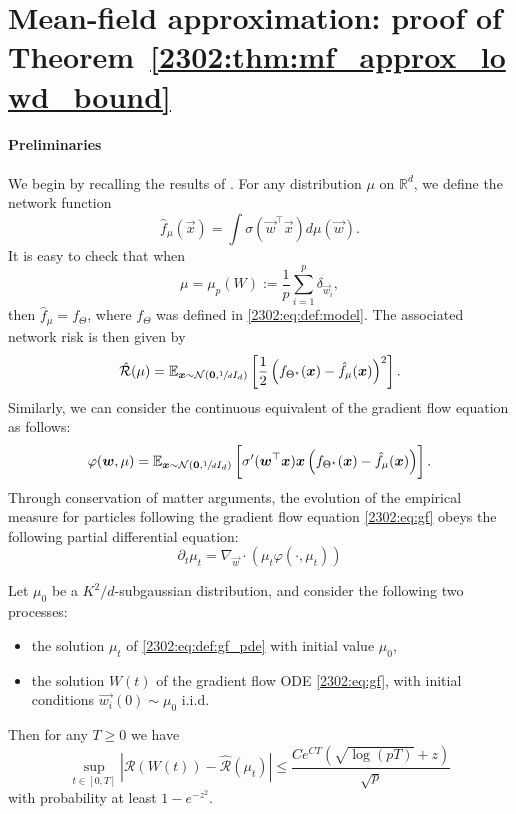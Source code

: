 \section{Mean-field approximation: proof of Theorem~\ref{2302:thm:mf_approx_lowd_bound}}

\label{2302:sec:app:mf}
\paragraph{Preliminaries} We begin by recalling the results of \cite{mei2019mean}. For any distribution $\mu$ on $\mathbb R^d$, we define the network function
\begin{equation}
    \hat f_{\mu}(\vec{x}) = \int \sigma(\vec{w}^\top \vec{x}) d\mu(\vec{w}).
\end{equation}
It is easy to check that when
\[ \mu = \mu_p(W) := \frac1p \sum_{i = 1}^p \delta_{\vec{w}_i}, \]
then $\hat f_\mu = f_\Theta$, where $f_\Theta$ was defined in \eqref{2302:eq:def:model}. The associated network risk is then given by
\begin{equation}
    \hat{\mathcal{R}}(\mu) = \mathbb E_{{\boldsymbol{x}} \sim \mathcal N({\boldsymbol{0}}, \sfrac{1}{d} I_d)} \left[\frac12\left( f_{\Theta^\star}({\boldsymbol{x}}) - \hat f_\mu({\boldsymbol{x}}) \right)^2 \right].
\end{equation}
Similarly, we can consider the continuous equivalent of the gradient flow equation as follows: 
\begin{equation}
    \varphi({\boldsymbol{w}}, \mu) = \mathbb E_{{\boldsymbol{x}} \sim \mathcal N({\boldsymbol{0}}, \sfrac{1}{d} I_d)} \left[\sigma'({\boldsymbol{w}}^\top {\boldsymbol{x}}) {\boldsymbol{x}} \left( f_{\Theta^\star}({\boldsymbol{x}}) - \hat f_\mu({\boldsymbol{x}}) \right) \right].
\end{equation}
Through conservation of matter arguments, the evolution of the empirical measure for particles following the gradient flow equation \eqref{2302:eq:gf} obeys the following partial differential equation:
\begin{equation}
    \label{2302:eq:def:gf_pde}\tag{GF-PDE}
    \partial_t \mu_t = \nabla_{\vec{w}} \cdot \left( \mu_t \varphi( \cdot , \mu_t) \right) 
\end{equation}

\begin{theorem}\label{2302:thm:mei_mf_bound}
    Let $\mu_0$ be a $K^2/d$-subgaussian distribution, and consider the following two processes:
    \begin{itemize}
        \item the solution $\mu_t$ of \eqref{2302:eq:def:gf_pde} with initial value $\mu_0$,
        \item the solution $W(t)$ of the gradient flow ODE \eqref{2302:eq:gf}, with initial conditions $\vec{w_i}(0) \sim \mu_0$ i.i.d.
    \end{itemize}
    Then for any $T \geq 0$ we have
    \begin{equation}\label{2302:eq:app:mei_mf_bound}
        \sup_{t \in [0, T]} \left|\mathcal{R}(W(t)) - \hat{\mathcal{R}}(\mu_t) \right| \leq \frac{Ce^{CT} \left(\sqrt{\log(pT)} + z \right)}{\sqrt{p}}
    \end{equation}
    with probability at least $1 - e^{-z^2}$.
\end{theorem}

